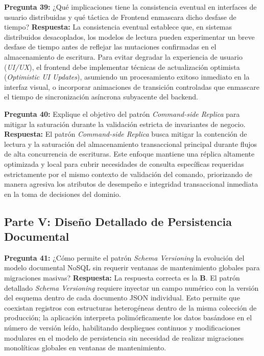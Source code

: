 \vspace{4mm}

\noindent\textbf{Pregunta 39:} ¿Qué implicaciones tiene la consistencia eventual en interfaces de usuario distribuidas y qué táctica de Frontend enmascara dicho desfase de tiempo?
\newline
\textbf{Respuesta:} La consistencia eventual establece que, en sistemas distribuidos desacoplados, los modelos de lectura pueden experimentar un breve desfase de tiempo antes de reflejar las mutaciones confirmadas en el almacenamiento de escritura. Para evitar degradar la experiencia de usuario (\textit{UI/UX}), el frontend debe implementar técnicas de actualización optimista (\textit{Optimistic UI Updates}), asumiendo un procesamiento exitoso inmediato en la interfaz visual, o incorporar animaciones de transición controladas que enmascare el tiempo de sincronización asíncrona subyacente del backend.

\vspace{4mm}

\noindent\textbf{Pregunta 40:} Explique el objetivo del patrón \textit{Command-side Replica} para mitigar la saturación durante la validación estricta de invariantes de negocio.
\newline
\textbf{Respuesta:} El patrón \textit{Command-side Replica} busca mitigar la contención de lectura y la saturación del almacenamiento transaccional principal durante flujos de alta concurrencia de escrituras. Este enfoque mantiene una réplica altamente optimizada y local para cubrir necesidades de consulta específicas requeridas estrictamente por el mismo contexto de validación del comando, priorizando de manera agresiva los atributos de desempeño e integridad transaccional inmediata en la toma de decisiones del dominio.

\subsection*{Parte V: Diseño Detallado de Persistencia Documental}

\noindent\textbf{Pregunta 41:} ¿Cómo permite el patrón \textit{Schema Versioning} la evolución del modelo documental NoSQL sin requerir ventanas de mantenimiento globales para migraciones masivas?
\newline
\textbf{Respuesta:} La respuesta correcta es la \textbf{B}. El patrón detallado \textit{Schema Versioning} requiere inyectar un campo numérico con la versión del esquema dentro de cada documento JSON individual. Esto permite que coexistan registros con estructuras heterogéneas dentro de la misma colección de producción; la aplicación interpreta polimórficamente los datos basándose en el número de versión leído, habilitando despliegues continuos y modificaciones modulares en el modelo de persistencia sin necesidad de realizar migraciones monolíticas globales en ventanas de mantenimiento.

